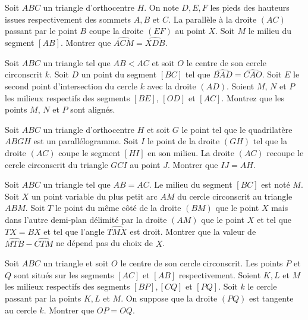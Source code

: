 \begin{exo}
Soit $ABC$ un triangle d'orthocentre $H$. On note $D,E,F$ les pieds des hauteurs issues respectivement des sommets $A,B$ et $C$. La parallèle à la droite $(AC)$ passant par le point $B$ coupe la droite $(EF)$ au point $X$. Soit $M$ le milieu du segment $[AB]$. Montrer que $\widehat{ACM} = \widehat{XDB}$.
\end{exo}


\begin{exo}[JBMO $2013$]
Soit $ABC$ un triangle tel que $AB<AC$ et soit $O$ le centre de son cercle circonscrit $k$. Soit $D$ un point du segment $[BC]$ tel que $\widehat{BAD} = \widehat{CAO}$. Soit $E$ le second point d'intersection du cercle $k$ avec la droite $(AD)$. Soient $M$, $N$ et $P$ les milieux respectifs des segments $[BE]$, $[OD]$ et $[AC]$. Montrez que les points $M$, $N$ et $P$ sont alignés.
\end{exo}


\begin{exo}[IMO SL 2015 G1]
Soit $ABC$ un triangle d'orthocentre $H$ et soit $G$ le point tel que le quadrilatère $ABGH$ est un parallélogramme. Soit $I$ le point de la droite $(GH)$ tel que la droite $(AC)$ coupe le segment $[HI]$ en son milieu. La droite $(AC)$ recoupe le cercle circonscrit du triangle $GCI$ au point $J$. Montrer que $IJ = AH$.
\end{exo}


\begin{exo}[IMO SL 2007 G2]
Soit $ABC$ un triangle tel que $AB = AC$. Le milieu du segment $[BC]$ est noté $M$. Soit $X$ un point variable du plus petit arc $AM$ du cercle circonscrit au triangle $ABM$. Soit $T$ le point du même côté de la droite $(BM)$ que le point $X$ mais dans l'autre demi-plan délimité par la droite $(AM)$ que le point $X$ et tel que $TX = BX$ et tel que l'angle $\widehat{TMX}$ est droit. Montrer que la valeur de $\widehat{MTB}-\widehat{CTM}$ ne dépend pas du choix de $X$.
\end{exo}


\begin{exo}[IMO 2009 P2]
Soit $ABC$ un triangle et soit $O$ le centre de son cercle circonscrit. Les points $P$ et $Q$ sont situés sur les segments $[AC]$ et $[AB]$ respectivement. Soient $K,L$ et $M$ les milieux respectifs des segments $[BP],[CQ]$ et $[PQ]$. Soit $k$ le cercle passant par la points $K,L$ et $M$. On suppose que la droite $(PQ)$ est tangente au cercle $k$. Montrer que $OP=OQ$.
\end{exo}


